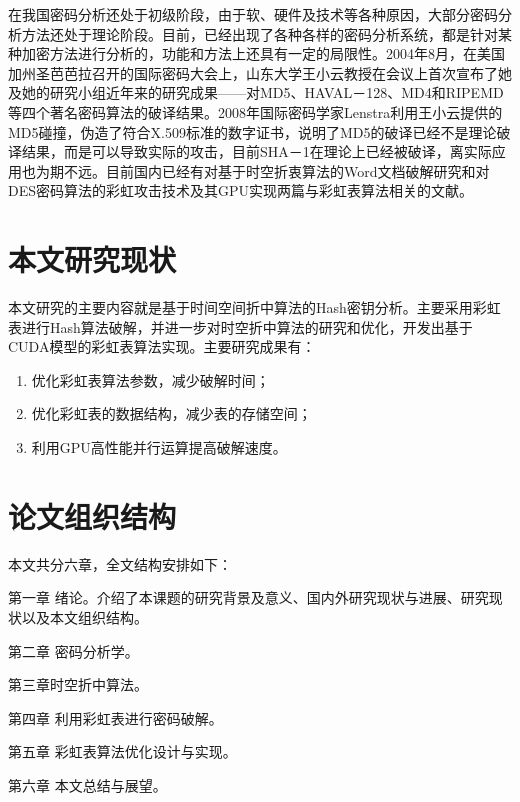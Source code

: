 在我国密码分析还处于初级阶段，由于软、硬件及技术等各种原因，大部分密码分析方法还处于理论阶段。目前，已经出现了各种各样的密码分析系统，都是针对某种加密方法进行分析的，功能和方法上还具有一定的局限性。2004年8月，在美国加州圣芭芭拉召开的国际密码大会上，山东大学王小云教授在会议上首次宣布了她及她的研究小组近年来的研究成果——对MD5、HAVAL－128、MD4和RIPEMD等四个著名密码算法的破译结果。2008年国际密码学家Lenstra利用王小云提供的MD5碰撞，伪造了符合X.509标准的数字证书，说明了MD5的破译已经不是理论破译结果，而是可以导致实际的攻击，目前SHA－1在理论上已经被破译，离实际应用也为期不远。目前国内已经有对基于时空折衷算法的Word文档破解研究\cite{word}和对DES密码算法的彩虹攻击技术及其GPU实现\cite{des}两篇与彩虹表算法相关的文献。
\section{本文研究现状}
本文研究的主要内容就是基于时间空间折中算法的Hash密钥分析。主要采用彩虹表进行Hash算法破解，并进一步对时空折中算法的研究和优化，开发出基于CUDA\cite{nvidia}模型的彩虹表算法实现。主要研究成果有：
\begin{enumerate}
\item 优化彩虹表算法参数，减少破解时间；
\item 优化彩虹表的数据结构，减少表的存储空间；
\item 利用GPU高性能并行运算提高破解速度。
\end{enumerate}
\section{论文组织结构}
本文共分六章，全文结构安排如下：

第一章 \quad 绪论。介绍了本课题的研究背景及意义、国内外研究现状与进展、研究现状以及本文组织结构。

第二章 \quad 密码分析学。

第三章\quad  时空折中算法。

第四章 \quad 利用彩虹表进行密码破解。

第五章 \quad 彩虹表算法优化设计与实现。

第六章 \quad 本文总结与展望。



